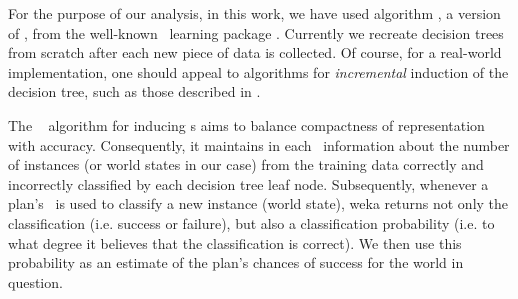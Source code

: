 For the purpose of our analysis, in this work, we have used algorithm
, a version of  \cite{Mitchell97:ML}, from the
well-known \weka\ learning package \cite{weka99}. Currently we
recreate decision trees from scratch after each new piece of data is collected.
Of course, for a real-world implementation, one should appeal to algorithms for
\emph{incremental} induction of the decision tree, such as those described in
\cite{Swere06:Fast,Utgoff97Decision}.
 
%


The \weka\  algorithm for inducing \dt{}s aims to balance
compactness of representation with accuracy. Consequently, it maintains in each
\dt\ information about the number of instances (or world states in our case) from
the training data correctly and incorrectly classified by each decision tree leaf
node. Subsequently, whenever a plan's \dt\ is used to classify a new instance
(world state), weka returns not only the classification (i.e. success or
failure), but also a classification probability (i.e. to what degree it believes
that the classification is correct). We then use this probability as an estimate
of the plan's chances of success for the world in question.


